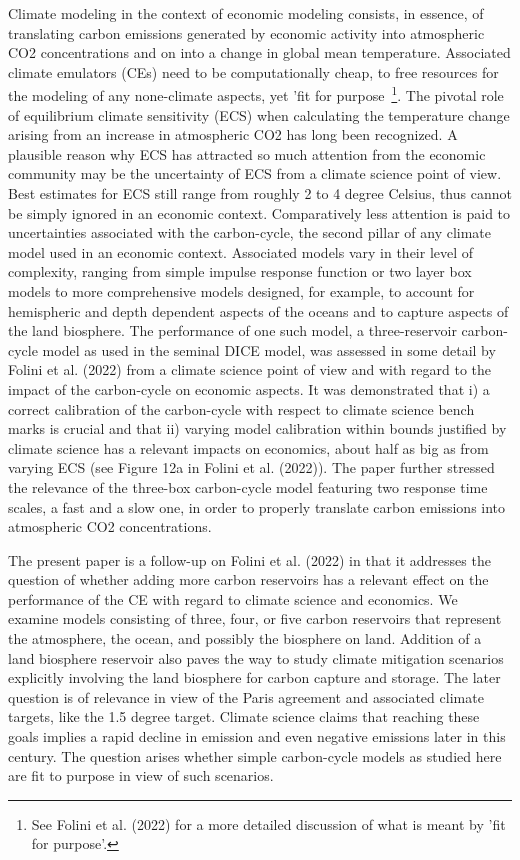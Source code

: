 \documentclass[11pt, a4paper, pdftex, twoside, dvipsnames]{article}
\begin{document}
Climate modeling in the context of economic modeling consists, in essence, of translating carbon emissions generated by economic activity into atmospheric CO2 concentrations and on into a change in global mean temperature. Associated climate emulators (CEs) need to be computationally cheap, to free resources for the modeling of any none-climate aspects, yet 'fit for purpose~\footnote{See Folini et al. (2022) for a more detailed discussion of what is meant by 'fit for purpose'.}. The pivotal role of equilibrium climate sensitivity (ECS) when calculating the temperature change arising from an increase in atmospheric CO2 has long been recognized. A plausible reason why ECS has attracted so much attention from the economic community may be the uncertainty of ECS from a climate science point of view. Best estimates for ECS still range from roughly 2 to 4 degree Celsius, thus cannot be simply ignored in an economic context. Comparatively less attention is paid to uncertainties associated with the carbon-cycle, the second pillar of any climate model used in an economic context. Associated models vary in their level of complexity, ranging from simple impulse response function or two layer box models to more comprehensive models designed, for example, to account for hemispheric and depth dependent aspects of the oceans and to capture aspects of the land biosphere. The performance of one such model, a three-reservoir carbon-cycle model as used in the seminal DICE model, was assessed in some detail by Folini et al. (2022) from a climate science point of view and with regard to the impact of the carbon-cycle on economic aspects. It was demonstrated that i) a correct calibration of the carbon-cycle with respect to climate science bench marks is crucial and that ii) varying model calibration within bounds justified by climate science has a relevant impacts on economics, about half as big as from varying ECS (see Figure 12a in Folini et al. (2022)). The paper further stressed the relevance of the three-box carbon-cycle model featuring two response time scales, a fast and a slow one, in order to properly translate carbon emissions into atmospheric CO2 concentrations. 

The present paper is a follow-up on Folini et al. (2022) in that it addresses the question of whether adding more carbon reservoirs has a relevant effect on the performance of the CE with regard to climate science and economics. We examine models consisting of three, four, or five carbon reservoirs that represent the atmosphere, the ocean, and possibly the biosphere on land. Addition of a land biosphere reservoir also paves the way to study climate mitigation scenarios explicitly involving the land biosphere for carbon capture and storage. The later question is of relevance in view of the Paris agreement and associated climate targets, like the 1.5 degree target. Climate science claims that reaching these goals implies a rapid decline in emission and even negative emissions later in this century. The question arises whether simple carbon-cycle models as studied here are fit to purpose in view of such scenarios. 
\end{document}

